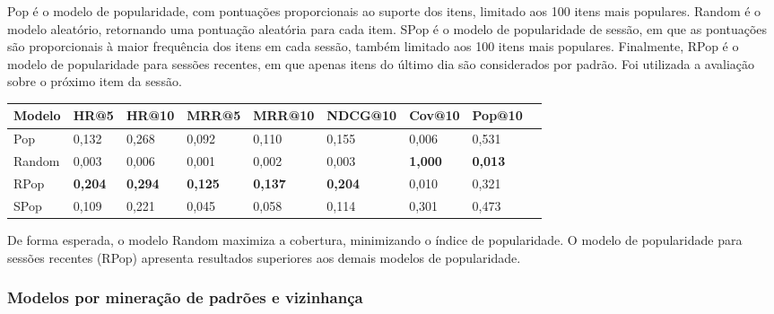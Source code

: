   Pop é o modelo de popularidade, com pontuações proporcionais ao suporte dos
  itens, limitado aos 100 itens mais populares. Random é o modelo aleatório,
  retornando uma pontuação aleatória para cada item. SPop é o modelo de
  popularidade de sessão, em que as pontuações são proporcionais à maior
  frequência dos itens em cada sessão, também limitado aos 100 itens mais
  populares. Finalmente, RPop é o modelo de popularidade para sessões recentes,
  em que apenas itens do último dia são considerados por padrão. Foi utilizada a
  avaliação sobre o próximo item da sessão.
\begin{table}[htbp]
  \centering
  \begin{tabular}
    {|l|l|l|l|l|l|l|l|l|}
    \hline
    Modelo & HR@5 & HR@10 & MRR@5 & MRR@10 & NDCG@10 & Cov@10 & Pop@10 \\ \hline
    Pop & 0,132 & 0,268 & 0,092 & 0,110 & 0,155 & 0,006 & 0,531 \\ \hline
    Random & 0,003 & 0,006 & 0,001 & 0,002 & 0,003 & \textbf{1,000} & \textbf{0,013} \\ \hline
    RPop & \textbf{0,204} & \textbf{0,294} & \textbf{0,125} & \textbf{0,137} & \textbf{0,204} & 0,010 & 0,321 \\ \hline
    SPop & 0,109 & 0,221 & 0,045 & 0,058 & 0,114 & 0,301 & 0,473 \\ \hline
  \end{tabular}
\end{table}

De forma esperada, o modelo Random maximiza a cobertura, minimizando o índice de
popularidade. O modelo de popularidade para sessões recentes (RPop) apresenta
resultados superiores aos demais modelos de popularidade.


\subsubsection{Modelos por mineração de padrões e vizinhança}


